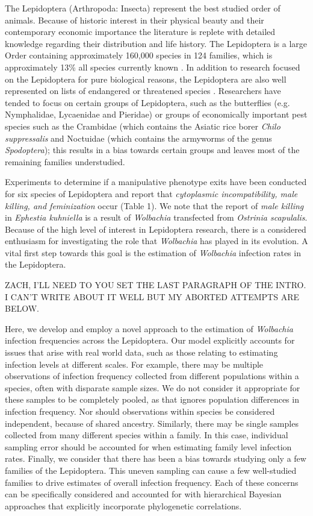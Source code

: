 \documentclass{frontiersSCNS} %
\begin{document}
The Lepidoptera (Arthropoda: Insecta) represent the best studied order of animals. Because of historic interest in their physical beauty and their contemporary economic importance the literature is replete with detailed knowledge regarding their distribution and life history. The  Lepidoptera is a large Order containing approximately 160,000 species in 124 families, which is approximately 13\% all species currently known \cite{Regier:2013fp}. In addition to research focused on the Lepidoptera for pure biological reasons, the Lepidoptera are also well represented on lists of endangered or threatened species \citep{Hamm:2014wi}. Researchers have tended to focus on certain groups of Lepidoptera, such as the butterflies (e.g. Nymphalidae, Lycaenidae and Pieridae) or groups of economically important pest species such as the Crambidae (which contains the Asiatic rice borer \textit{Chilo suppressalis} and Noctuidae (which contains the armyworms of the genus \textit{Spodoptera}); this results in a bias towards certain groups and leaves most of the remaining families understudied. 

Experiments to determine if a manipulative phenotype exits have been conducted for six species of Lepidoptera and report that \emph{cytoplasmic incompatibility, male killing, \emph{and} feminization} occur (Table 1). We note that the report of \textit{male killing} in \textit{Ephestia kuhniella} is a result of \textit{Wolbachia} transfected from \textit{Ostrinia scapulalis}. Because of the high level of interest in Lepidoptera research, there is a considered enthusiasm for investigating the role that \textit{Wolbachia} has played in its evolution. A vital first step towards this goal is the estimation of \textit{Wolbachia} infection rates in the Lepidoptera. 

ZACH, I'LL NEED TO YOU SET THE LAST PARAGRAPH OF THE INTRO. I CAN'T WRITE ABOUT IT WELL BUT MY ABORTED ATTEMPTS ARE BELOW.

Here, we develop and employ a novel approach to the estimation of \textit{Wolbachia} infection frequencies across the Lepidoptera. Our model explicitly accounts for issues that arise with real world data, such as those relating to estimating infection levels at different scales. For example, there may be multiple observations of infection frequency collected from different populations within a species, often with disparate sample sizes. We do not consider it appropriate for these samples to be completely pooled, as that ignores population differences in infection frequency. Nor should observations within species be considered independent, because of shared ancestry.  Similarly, there may be single samples collected from many different species within a family. In this case, individual sampling error should be accounted for when estimating family level infection rates. Finally, we consider that there has been a bias towards studying only a few families of the Lepidoptera. This uneven sampling can cause a few well-studied families to drive estimates of overall infection frequency. Each of these concerns can be specifically considered and accounted for with hierarchical Bayesian approaches that explicitly incorporate phylogenetic correlations. 
\end{document}
